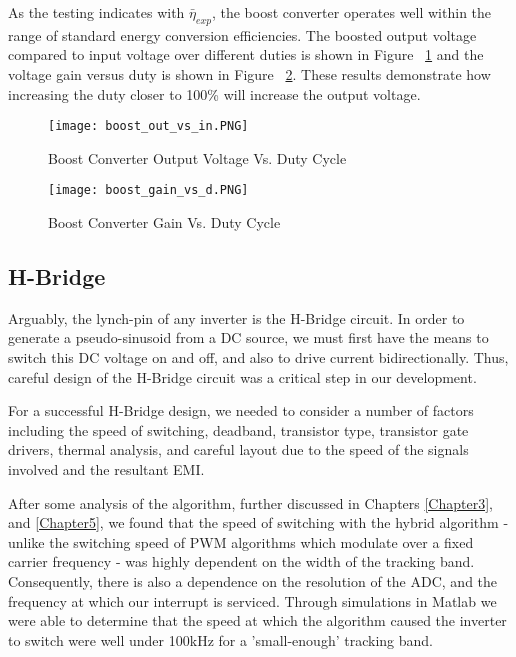 As the testing indicates with $\bar{\eta}_{exp}$, the boost converter operates well within the range of standard energy conversion efficiencies. The boosted output voltage compared to input voltage over different duties is shown in Figure ~\ref{Boost Converter Output Voltage Vs. Duty Cycle} and the voltage gain versus duty is shown in Figure ~\ref{Boost Converter Gain Vs. Duty Cycle}. These results demonstrate how increasing the duty closer to 100\% will increase the output voltage.

\begin{figure}
\centering
\texttt{[image: boost\_out\_vs\_in.PNG]}
\caption{Boost Converter Output Voltage Vs. Duty Cycle}
\label{Boost Converter Output Voltage Vs. Duty Cycle}
\end{figure}

\begin{figure}
\centering
\texttt{[image: boost\_gain\_vs\_d.PNG]}
\caption{Boost Converter Gain Vs. Duty Cycle}
\label{Boost Converter Gain Vs. Duty Cycle}
\end{figure}



\subsection{H-Bridge}
Arguably, the lynch-pin of any inverter is the H-Bridge circuit. In order to generate a pseudo-sinusoid from a DC source, we must first have the means to switch this DC voltage on and off, and also to drive current bidirectionally. Thus, careful design of the H-Bridge circuit was a critical step in our development.

For a successful H-Bridge design, we needed to consider a number of factors including the speed of switching, deadband, transistor type, transistor gate drivers, thermal analysis, and careful layout due to the speed of the signals involved and the resultant EMI.

After some analysis of the algorithm, further discussed in Chapters \ref{Chapter3}, and \ref{Chapter5}, we found that the speed of switching with the hybrid algorithm - unlike the switching speed of PWM algorithms which modulate over a fixed carrier frequency - was highly dependent on the width of the tracking band. Consequently, there is also a dependence on the resolution of the ADC, and the frequency at which our interrupt is serviced. Through simulations in Matlab we were able to determine that the speed at which the algorithm caused the inverter to switch were well under 100kHz for a 'small-enough' tracking band. 

